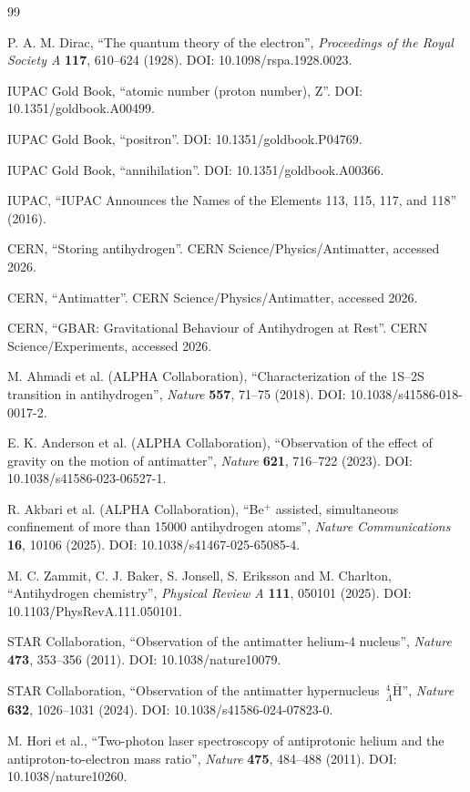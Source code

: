 \documentclass[11pt,a4paper]{article}
\begin{document}
\begin{thebibliography}{99}

P. A. M. Dirac, \enquote{The quantum theory of the electron}, \emph{Proceedings of the Royal Society A} \textbf{117}, 610--624 (1928). DOI: 10.1098/rspa.1928.0023.

IUPAC Gold Book, \enquote{atomic number (proton number), Z}. DOI: 10.1351/goldbook.A00499.

IUPAC Gold Book, \enquote{positron}. DOI: 10.1351/goldbook.P04769.

IUPAC Gold Book, \enquote{annihilation}. DOI: 10.1351/goldbook.A00366.

IUPAC, \enquote{IUPAC Announces the Names of the Elements 113, 115, 117, and 118} (2016).

CERN, \enquote{Storing antihydrogen}. CERN Science/Physics/Antimatter, accessed 2026.

CERN, \enquote{Antimatter}. CERN Science/Physics/Antimatter, accessed 2026.

CERN, \enquote{GBAR: Gravitational Behaviour of Antihydrogen at Rest}. CERN Science/Experiments, accessed 2026.

M. Ahmadi et al. (ALPHA Collaboration), \enquote{Characterization of the 1S--2S transition in antihydrogen}, \emph{Nature} \textbf{557}, 71--75 (2018). DOI: 10.1038/s41586-018-0017-2.

E. K. Anderson et al. (ALPHA Collaboration), \enquote{Observation of the effect of gravity on the motion of antimatter}, \emph{Nature} \textbf{621}, 716--722 (2023). DOI: 10.1038/s41586-023-06527-1.

R. Akbari et al. (ALPHA Collaboration), \enquote{Be$^{+}$ assisted, simultaneous confinement of more than 15000 antihydrogen atoms}, \emph{Nature Communications} \textbf{16}, 10106 (2025). DOI: 10.1038/s41467-025-65085-4.

M. C. Zammit, C. J. Baker, S. Jonsell, S. Eriksson and M. Charlton, \enquote{Antihydrogen chemistry}, \emph{Physical Review A} \textbf{111}, 050101 (2025). DOI: 10.1103/PhysRevA.111.050101.

STAR Collaboration, \enquote{Observation of the antimatter helium-4 nucleus}, \emph{Nature} \textbf{473}, 353--356 (2011). DOI: 10.1038/nature10079.

STAR Collaboration, \enquote{Observation of the antimatter hypernucleus $\,{}_{\bar\Lambda}^{4}\overline{\mathrm{H}}$}, \emph{Nature} \textbf{632}, 1026--1031 (2024). DOI: 10.1038/s41586-024-07823-0.

M. Hori et al., \enquote{Two-photon laser spectroscopy of antiprotonic helium and the antiproton-to-electron mass ratio}, \emph{Nature} \textbf{475}, 484--488 (2011). DOI: 10.1038/nature10260.

\end{thebibliography}
\end{document}
